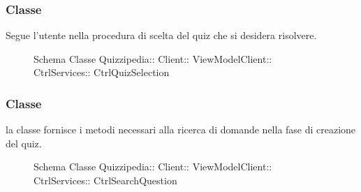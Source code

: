 \subsubsection{Classe }
Segue l'utente nella procedura di scelta del quiz che si desidera risolvere.
\begin{figure}[H]
\centering
\noindent{}
\caption[Schema Classe CtrlQuizSelection]{Schema Classe Quizzipedia:: Client:: ViewModelClient:: CtrlServices:: CtrlQuizSelection}
\end{figure}
\subsubsection{Classe }
la classe fornisce i metodi necessari alla ricerca di domande nella fase di creazione del quiz.
\begin{figure}[H]
\centering
\noindent{}
\caption[Schema Classe CtrlSearchQuestion]{Schema Classe Quizzipedia:: Client:: ViewModelClient:: CtrlServices:: CtrlSearchQuestion}
\end{figure}
